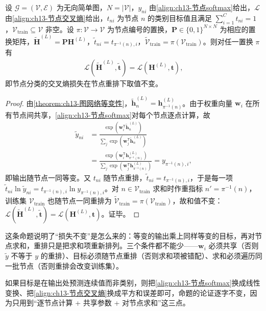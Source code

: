 \documentclass[../../main.tex]{subfiles}
\begin{document}
\begin{proposition}[节点分类损失的置换不变性]\label{proposition:ch13-节点分类损失不变性}
设 $\mathcal{G}=(\mathcal{V},\mathcal{E})$ 为无向简单图，$N=|\mathcal{V}|$，$y_{ni}$ 由\eqref{align:ch13-节点softmax}给出，$\mathcal{L}$ 由\eqref{align:ch13-节点交叉熵}给出，$t_{ni}$ 为节点 $n$ 的类别目标值且满足 $\sum_{i=1}^{C}t_{ni}=1$，$\mathcal{V}_{\mathrm{train}}\subseteq\mathcal{V}$ 非空。设 $\pi:\mathcal{V}\to\mathcal{V}$ 为节点编号的置换，$\bm{P}\in\{0,1\}^{N\times N}$ 为相应的置换矩阵，$\widetilde{\bm{H}}^{(L)}=\bm{P}\bm{H}^{(L)}$，$\widetilde{t}_{ni}=t_{\pi^{-1}(n),i}$，$\widetilde{\mathcal{V}}_{\mathrm{train}}=\pi(\mathcal{V}_{\mathrm{train}})$。则对任一置换 $\pi$ 有
\begin{align*}
\mathcal{L}(\widetilde{\bm{H}}^{(L)},\widetilde{\bm{t}})=\mathcal{L}(\bm{H}^{(L)},\bm{t}),
\end{align*}
即节点分类的交叉熵损失在节点重排下取值不变。
\end{proposition}

\begin{proof}
由\cref{theorem:ch13-图网络等变性}，$\widetilde{\bm{h}}_n^{(L)}=\bm{h}_{\pi^{-1}(n)}^{(L)}$。由于权重向量 $\bm{w}_i$ 在所有节点间共享，\eqref{align:ch13-节点softmax}对每个节点逐点计算，故
\begin{align*}
\widetilde{y}_{ni}&=\frac{\exp(\bm{w}_i^{\mathsf T}\widetilde{\bm{h}}_n^{(L)})}{\sum_j\exp(\bm{w}_j^{\mathsf T}\widetilde{\bm{h}}_n^{(L)})}\\
&=\frac{\exp(\bm{w}_i^{\mathsf T}\bm{h}_{\pi^{-1}(n)}^{(L)})}{\sum_j\exp(\bm{w}_j^{\mathsf T}\bm{h}_{\pi^{-1}(n)}^{(L)})}=y_{\pi^{-1}(n),i},
\end{align*}
即输出随节点一同等变。又 $t_{ni}$ 随节点重排，$\widetilde{t}_{ni}=t_{\pi^{-1}(n),i}$，于是每一项 $\widetilde{t}_{ni}\ln\widetilde{y}_{ni}=t_{\pi^{-1}(n),i}\ln y_{\pi^{-1}(n),i}$。对 $n\in\mathcal{V}_{\mathrm{train}}$ 求和时作重指标 $n'=\pi^{-1}(n)$，训练集 $\mathcal{V}_{\mathrm{train}}$ 也随节点一同重排为 $\widetilde{\mathcal{V}}_{\mathrm{train}}=\pi(\mathcal{V}_{\mathrm{train}})$，故和值不变：$\mathcal{L}(\widetilde{\bm{H}}^{(L)},\widetilde{\bm{t}})=\mathcal{L}(\bm{H}^{(L)},\bm{t})$。证毕。
\end{proof}

\begin{remark}
这条命题说明了“损失不变”是怎么来的：等变的输出乘上同样等变的目标，再对节点求和，重排只是把求和项重新排列。三个条件都不能少——$\bm{w}_i$ 必须共享（否则 $\widetilde{y}$ 不等于 $y$ 的重排）、目标必须随节点重排（否则求和项被错配）、求和必须遍历同一批节点（否则重排会改变训练集）。\par
如果目标是在输出处预测连续值而非类别，则把\eqref{align:ch13-节点softmax}换成线性变换、把\eqref{align:ch13-节点交叉熵}换成平方和误差即可，命题的论证逐字不变，因为只用到“逐节点计算 + 共享参数 + 对节点求和”这三点。
\end{remark}
\end{document}
